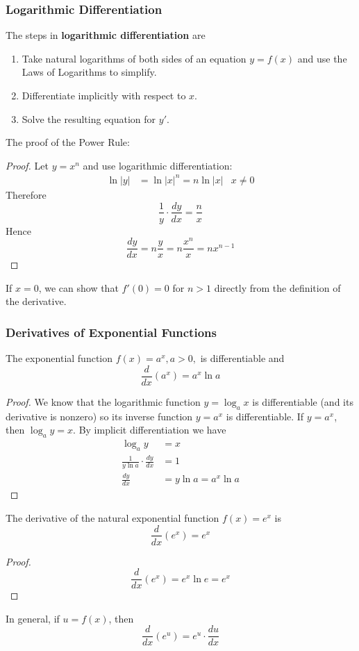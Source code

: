 \subsubsection*{Logarithmic Differentiation}
The steps in \textbf{logarithmic differentiation} are
\begin{enumerate}
    \item Take natural logarithms of both sides of an equation \(y=f(x)\) and
    use the Laws of Logarithms to simplify.
    \item Differentiate implicitly with respect to \(x\).
    \item Solve the resulting equation for \(y'\).
\end{enumerate}
The proof of the Power Rule:
\begin{proof}
    Let \(y=x^n\) and use logarithmic differentiation:
    \begin{align*}
        \ln|y| &= \ln|x|^n=n\ln|x| & x\neq 0
    \end{align*}
    Therefore
    \[\frac{1}{y}\cdot\frac{dy}{dx}=\frac{n}{x}\]
    Hence
    \[\frac{dy}{dx}=n\frac{y}{x}=n\frac{x^n}{x}=nx^{n-1}\]
\end{proof}
If \(x=0\), we can show that \(f'(0)=0\) for \(n>1\) directly from the
definition of the derivative.

\subsubsection*{Derivatives of Exponential Functions}
\begin{theorem}
    The exponential function \(f(x)=a^x,a>0,\) is differentiable and
    \[\frac{d}{dx}(a^x)=a^x\ln a\]
\end{theorem}
\begin{proof}
    We know that the logarithmic function \(y=\log_a x\) is differentiable
    (and its derivative is nonzero) so its inverse function \(y=a^x\) is
    differentiable.
    If \(y=a^x\), then \(\log_a y=x\).
    By implicit differentiation we have
    \begin{align*}
        \log_a y &= x \\
        \frac{1}{y\ln a}\cdot\frac{dy}{dx} &= 1 \\
        \frac{dy}{dx} &= y\ln a=a^x\ln a 
    \end{align*}
\end{proof}
The derivative of the natural exponential function \(f(x)=e^x\) is
\[\frac{d}{dx}(e^x)=e^x\]
\begin{proof}
    \[\frac{d}{dx}(e^x)=e^x\ln e=e^x\]
\end{proof}
In general, if \(u=f(x)\), then
\[\frac{d}{dx}(e^u)=e^u\cdot\frac{du}{dx}\]

